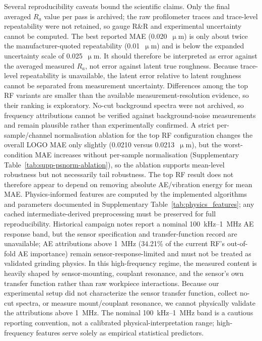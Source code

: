 Several reproducibility caveats bound the scientific claims. Only the
final averaged $R_a$ value per pass is archived; the raw profilometer
traces and trace-level repeatability were not retained, so gauge R\&R
	and experimental uncertainty cannot be computed. The best reported MAE
	(0.020~\(\upmu\)m) is only about twice the manufacturer-quoted
	repeatability (0.01~\(\upmu\)m) and is below the expanded uncertainty
	scale of 0.025~\(\upmu\)m. It should therefore be interpreted as error
	against the averaged measured \(R_a\), not error against latent true
	roughness. Because trace-level repeatability is unavailable, the latent
	error relative to latent roughness cannot be separated from
	measurement uncertainty. Differences among the top RF
variants are smaller than the available measurement-resolution evidence,
so their ranking is exploratory. No-cut background spectra were
not archived, so frequency attributions cannot be verified against
background-noise measurements and remain plausible rather than
experimentally confirmed. A strict per-sample/channel normalisation ablation for the top RF
configuration changes the overall LOGO MAE only slightly (0.0210
versus 0.0213~\(\upmu\)m), but the worst-condition MAE increases without
per-sample normalisation (Supplementary
Table~\ref{tab:supp-psnorm-ablation}), so the ablation supports
mean-level robustness but not necessarily tail robustness. The top RF
result does not therefore appear to depend on removing absolute
AE/vibration energy for mean MAE. Physics-informed features are computed by
the implemented algorithms and parameters documented in Supplementary
Table~\ref{tab:physics_features}; any cached intermediate-derived
preprocessing must be preserved for full reproducibility. Historical campaign
notes report a nominal 100~kHz--1~MHz AE response band, but the sensor
specification and transfer-function record are unavailable; AE
attributions above 1~MHz (34.21\% of the current RF's out-of-fold AE importance)
remain sensor-response-limited and must not be treated as validated grinding physics. In this high-frequency regime, the measured content is heavily shaped by sensor-mounting, couplant resonance, and the sensor's own transfer function rather than raw workpiece interactions. Because our experimental setup did not characterize the sensor transfer function, collect no-cut spectra, or measure mount/couplant resonance, we cannot physically validate the attributions above 1~MHz. The nominal 100~kHz--1~MHz band is a cautious reporting convention, not a calibrated physical-interpretation range; high-frequency features serve solely as empirical statistical predictors.

